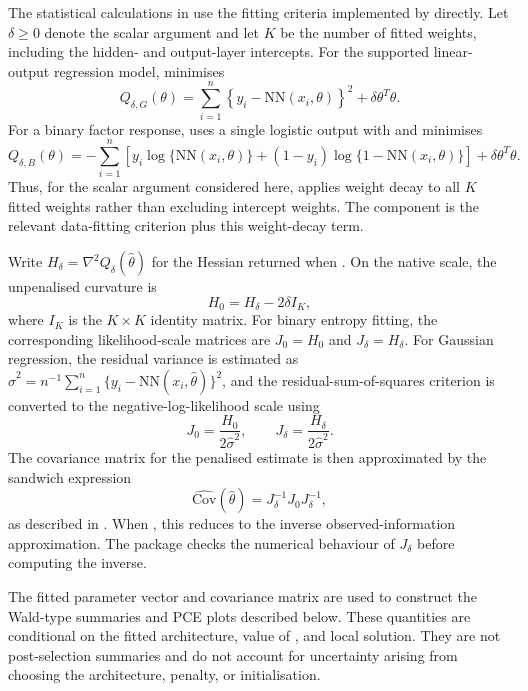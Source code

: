 The statistical calculations in  use the fitting criteria implemented by  directly.
Let \(\delta \geq 0\) denote the scalar  argument and let \(K\) be the number of fitted weights, including the hidden- and output-layer intercepts.
For the supported linear-output regression model,  minimises
\[
  Q_{\delta,G}(\theta)
  =
  \sum_{i=1}^n
  \left\{y_i - \mathrm{NN}(x_i,\theta)\right\}^2
  +
  \delta\theta^T\theta.
\]
For a binary factor response,  uses a single logistic output with  and minimises
\[
  Q_{\delta,B}(\theta)
  =
  -\sum_{i=1}^n
  \left[
    y_i\log\{\mathrm{NN}(x_i,\theta)\}
    +(1-y_i)\log\{1-\mathrm{NN}(x_i,\theta)\}
  \right]
  +
  \delta\theta^T\theta.
\]
Thus, for the scalar  argument considered here,  applies weight decay to all \(K\) fitted weights rather than excluding intercept weights.
The component  is the relevant data-fitting criterion plus this weight-decay term.

Write \(H_\delta = \nabla^2 Q_\delta(\hat\theta)\) for the Hessian returned when .
On the native  scale, the unpenalised curvature is
\[
  H_0 = H_\delta - 2\delta I_K,
\]
where \(I_K\) is the \(K\times K\) identity matrix.
For binary entropy fitting, the corresponding likelihood-scale matrices are \(J_0=H_0\) and \(J_\delta=H_\delta\).
For Gaussian regression, the residual variance is estimated as \(\hat\sigma^2=n^{-1}\sum_{i=1}^n\{y_i-\mathrm{NN}(x_i,\hat\theta)\}^2\), and the residual-sum-of-squares criterion is converted to the negative-log-likelihood scale using
\[
  J_0 = \frac{H_0}{2\hat\sigma^2},
  \qquad
  J_\delta = \frac{H_\delta}{2\hat\sigma^2}.
\]
The covariance matrix for the penalised estimate is then approximated by the sandwich expression
\[
  \widehat{\mathrm{Cov}}(\hat\theta)
  =
  J_\delta^{-1}J_0J_\delta^{-1},
\]
as described in \citet{mcinerney2023feedforward}.
When , this reduces to the inverse observed-information approximation.
The package checks the numerical behaviour of \(J_\delta\) before computing the inverse.

The fitted parameter vector and covariance matrix are used to construct the Wald-type summaries and PCE plots described below.
These quantities are conditional on the fitted architecture, value of , and local solution.
They are not post-selection summaries and do not account for uncertainty arising from choosing the architecture, penalty, or initialisation.

